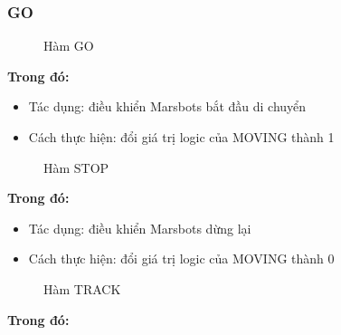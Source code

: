 \documentclass[a4paper,12pt]{article}
\begin{document}
\subsubsection{GO}
\FloatBarrier
\begin{figure}[ht!]
	\centerline{}
	\caption{Hàm GO}
	\label{fig:ass1}
\end{figure}
\noindent
\textbf{Trong đó: }
\begin{itemize}
	\item Tác dụng: điều khiển Marsbots bắt đầu di chuyển
	\item Cách thực hiện: đổi giá trị logic của MOVING thành 1
\end{itemize}
\FloatBarrier
\begin{figure}[ht!]
	\centerline{}
	\caption{Hàm STOP}
	\label{fig:ass1}
\end{figure}
\clearpage
\noindent
\textbf{Trong đó: }
\begin{itemize}
	\item Tác dụng: điều khiển Marsbots dừng lại
	\item Cách thực hiện: đổi giá trị logic của MOVING thành 0
\end{itemize}
\FloatBarrier
\begin{figure}[ht!]
	\centerline{}
	\caption{Hàm TRACK}
	\label{fig:ass1}
\end{figure}
\noindent
\textbf{Trong đó: }
\end{document}
